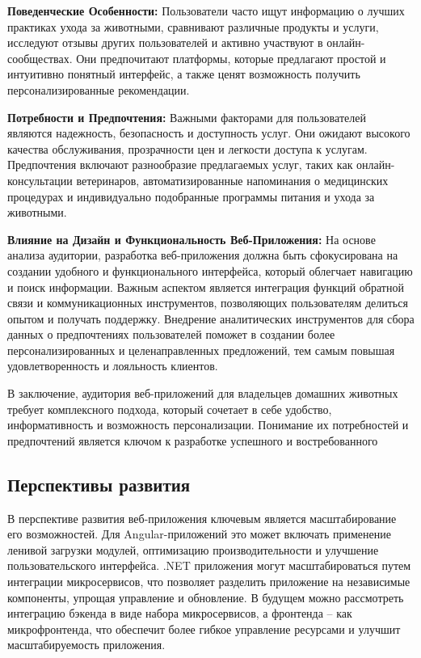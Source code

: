 \textbf{Поведенческие Особенности:}
Пользователи часто ищут информацию о лучших практиках ухода за животными, сравнивают различные продукты и услуги, исследуют отзывы других пользователей и активно участвуют в онлайн-сообществах. Они предпочитают платформы, которые предлагают простой и интуитивно понятный интерфейс, а также ценят возможность получить персонализированные рекомендации.

\textbf{Потребности и Предпочтения:}
Важными факторами для пользователей являются надежность, безопасность и доступность услуг. Они ожидают высокого качества обслуживания, прозрачности цен и легкости доступа к услугам. Предпочтения включают разнообразие предлагаемых услуг, таких как онлайн-консультации ветеринаров, автоматизированные напоминания о медицинских процедурах и индивидуально подобранные программы питания и ухода за животными.

\textbf{Влияние на Дизайн и Функциональность Веб-Приложения:}
На основе анализа аудитории, разработка веб-приложения должна быть сфокусирована на создании удобного и функционального интерфейса, который облегчает навигацию и поиск информации. Важным аспектом является интеграция функций обратной связи и коммуникационных инструментов, позволяющих пользователям делиться опытом и получать поддержку. Внедрение аналитических инструментов для сбора данных о предпочтениях пользователей поможет в создании более персонализированных и целенаправленных предложений, тем самым повышая удовлетворенность и лояльность клиентов.

В заключение, аудитория веб-приложений для владельцев домашних животных требует комплексного подхода, который сочетает в себе удобство, информативность и возможность персонализации. Понимание их потребностей и предпочтений является ключом к разработке успешного и востребованного

\subsection{Перспективы развития}

В перспективе развития веб-приложения ключевым является масштабирование его возможностей. Для Angular-приложений это может включать применение ленивой загрузки модулей, оптимизацию производительности и улучшение пользовательского интерфейса. .NET приложения могут масштабироваться путем интеграции микросервисов, что позволяет разделить приложение на независимые компоненты, упрощая управление и обновление. В будущем можно рассмотреть интеграцию бэкенда в виде набора микросервисов, а фронтенда – как микрофронтенда, что обеспечит более гибкое управление ресурсами и улучшит масштабируемость приложения.

